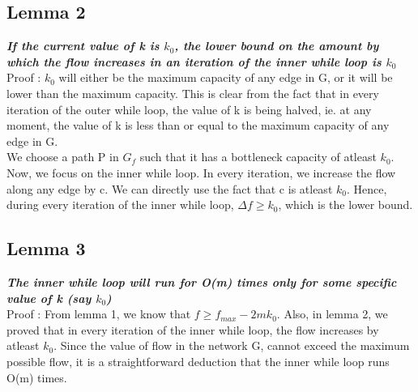 \documentclass{article}
\begin{document}
\subsection{Lemma 2}
\textbf{\textit{If the current value of k is $k_{0}$, the lower bound on the amount by which the flow increases in an iteration of the inner while loop is $k_{0}$}}
\vspace{0.2cm}\\
Proof : $k_{0}$ will either be the maximum capacity of any edge in G, or it will be lower than the maximum capacity. This is clear from the fact that in every iteration of the outer while loop, the value of k is being halved, ie. at any moment, the value of k is less than or equal to the maximum capacity of any edge in G. \\
We choose a path P in $G_{f}$ such that it has a bottleneck capacity of atleast $k_{0}$.\\
Now, we focus on the inner while loop. In every iteration, we increase the flow along any edge by c. We can directly use the fact that c is atleast $k_{0}$. Hence, during every iteration of the inner while loop, $\Delta f \geq k_{0}$, which is the lower bound.

\subsection{Lemma 3}
\textbf{\textit{The inner while loop will run for O(m) times only for some specific value of k (say $k_{0}$)}}
\vspace{0.2cm}\\
Proof : From lemma 1, we know that $f \geq f_{max}-2mk_{0}$. Also, in lemma 2, we proved that in every iteration of the inner while loop, the flow increases by atleast $k_{0}$. Since the value of flow in the network G, cannot exceed the maximum possible flow, it is a straightforward deduction that the inner while loop runs O(m) times.
\end{document}
